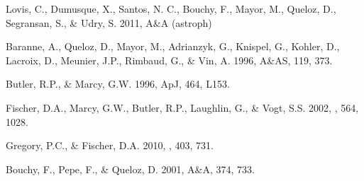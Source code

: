\documentclass[12pt,preprint]{emulateapj}
\begin{document}

\begin{thebibliography}{}
Lovis, C., Dumusque, X., Santos, N. C., Bouchy, F., Mayor, M., Queloz, D., Segransan, S., \& Udry, S. 2011, A\&A (astroph)

Baranne, A., Queloz, D., Mayor, M., Adrianzyk, G., Knispel, G., Kohler, D., Lacroix, D., Meunier, J.P., Rimbaud, G., \& Vin, A. 1996, A\&AS, 119, 373.

Butler, R.P., \& Marcy, G.W. 1996, ApJ, 464, L153.

Fischer, D.A., Marcy, G.W., Butler, R.P., Laughlin, G., \& Vogt, S.S. 2002, \apj, 564, 1028.

Gregory, P.C., \& Fischer, D.A. 2010, \mnras, 403, 731.

Bouchy, F., Pepe, F., \& Queloz, D. 2001, A\&A, 374, 733.

\end{thebibliography}
\end{document}
